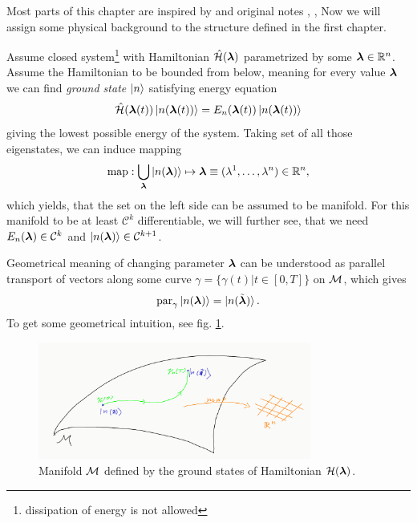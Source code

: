 Most parts of this chapter are inspired by \citep{kolodrubez} and original notes \citep{berry1984}, \citep{berry1989}, \citep{berry2009}
Now we will assign some physical background to the structure defined in the first chapter.

Assume closed system\footnote{dissipation of energy is not allowed} with Hamiltonian $\hat{\mathcal{H}}({\bm\lambda})$ parametrized by some ${\bm\lambda}\in \mathbb{R}^n$. Assume the Hamiltonian to be bounded from below, meaning for every value ${\bm\lambda}$ we can find \emph{ground state} $\ket{n}$ satisfying energy \Schrodinger equation
\begin{equation}
    \hat{\mathcal{H}}({\bm\lambda}(t))\ket{n({\bm\lambda}(t))}=E_n({\bm\lambda}(t))\ket{n({\bm\lambda}(t))}
    \label{eq:energySchrodinger}
\end{equation}
giving the lowest possible energy of the system. Taking set of all those eigenstates, we can induce mapping
$$\text{map}: \bigcup_{\bm\lambda} \ket{n({\bm\lambda})}\mapsto \bm{{\bm\lambda}}\equiv (\lambda^1,\dots,\lambda^n)\in\mathbb{R}^n,$$
which yields, that the set on the left side can be assumed to be manifold. For this manifold to be at least $\mathcal{C}^k$ differentiable, we will further see, that we need $E_n({\bm\lambda})\in\mathcal{C}^k$ and $\ket{n({\bm\lambda})}\in\mathcal{C}^{k+1}$.

Geometrical meaning of changing parameter ${\bm\lambda}$ can be understood as parallel transport of vectors along some curve $\gamma=\{\gamma(t)| t\in[0,T]\}$ on $\mathcal{M}$, which gives
\begin{equation}
    \textrm{par}_\gamma \ket{n({\bm\lambda})} = \ket{n(\tilde {{\bm\lambda}})}.
\end{equation}
To get some geometrical intuition, see fig. \ref{fig:manifoldIntuition}.

\begin{figure}[h]
    \centering
    \includegraphics[width=0.8\textwidth]{../img/manifoldIntuitionTransport.png}
\caption{Manifold $\mathcal{M}$ defined by the ground states of Hamiltonian $\mathcal{H}({\bm\lambda})$.}
    \label{fig:manifoldIntuition}
\end{figure}


